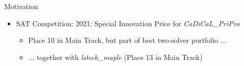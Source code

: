 \documentclass[en]{sdqbeamer}
\DeclareMathOperator*{\argmin}{arg\,min}
\begin{document}
\begin{frame}[t]{Motivation}
\begin{itemize}
		\vspace{\baselineskip}
		\pause
		\item SAT Competition: 2021: Special Innovation Price for \emph{CaDiCaL\_PriPro}
		\begin{itemize}
			\item Place 10 in Main Track, but part of best two-solver portfolio ...
			\pause
			\item ... together with \emph{lstech\_maple} (Place 13 in Main Track)
		\end{itemize}
	\end{itemize}
\end{frame}

\end{document}
